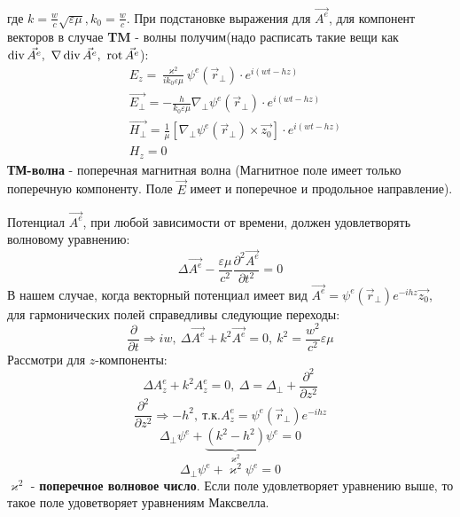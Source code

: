 где $k = \frac{w}{c}\sqrt{\varepsilon\mu}, k_0 = \frac{w}{c}$. При подстановке выражения для $\vec{A^e}$, для компонент
векторов в случае \textbf{TM} - волны получим(надо расписать такие вещи как $\operatorname{div}{\vec{A^e}},~ \nabla \operatorname{div}{\vec{A^e}},~\operatorname{rot}{\vec{A^e}}$):
\begin{align*}
  &E_z = \frac{\varkappa^2}{ik_0\varepsilon\mu} \psi^e(\vec{r}_{\perp})\cdot e^{i(wt-hz)}\\
  &\vec{E_{\perp}} = -\frac{h}{k_0\varepsilon\mu}\nabla_{\perp} \psi^e(\vec{r}_{\perp})\cdot e^{i(wt-hz)}\\
  &\vec{H_{\perp}} = \frac{1}{\mu}[\nabla_{\perp} \psi^e(\vec{r}_{\perp})\times\vec{z_0}]\cdot e^{i(wt-hz)}\\
  &H_z = 0
\end{align*}
\textbf{ТМ-волна} - поперечная магнитная волна (Магнитное поле имеет только поперечную компоненту. Поле $\vec{E}$ имеет и поперечное и
продольное направление). 

Потенциал $\vec{A^e}$, при любой зависимости от времени, должен удовлетворять волновому уравнению:
\begin{equation}
  \Delta \vec{A^e} - \frac{\varepsilon\mu}{c^2} \frac{\partial^2\vec{A^e}}{\partial t^2} = 0
\end{equation}
В нашем случае, когда векторный потенциал имеет вид $\vec{A^e} = \psi^e(\vec{r}_{\perp})e^{-ihz}\vec{z_0}$, для
гармонических полей справедливы следующие переходы:
\begin{equation}
  \frac{\partial}{\partial t} \Rightarrow iw,~ \Delta \vec{A^e} + k^2 \vec{A^e} =0,~ k^2 = \frac{w^2}{c^2}\varepsilon\mu
\end{equation}
Рассмотри для $z$-компоненты:
\begin{equation}
  \Delta A^e_z + k^2 A^e_z =0,~ \Delta = \Delta_{\perp} + \frac{\partial^2}{\partial z^2}
\end{equation}
\begin{equation}
  \frac{\partial^2}{\partial z^2} \Rightarrow -h^2,~ \text{т.к.} A^e_z = \psi^e(\vec{r}_{\perp})e^{-ihz}
\end{equation}
\begin{equation}
  \Delta_{\perp}\psi^e+\underbrace{(k^2-h^2)}_{\varkappa^2}\psi^e=0
\end{equation}
\begin{equation}
  \Delta_{\perp}\psi^e+\varkappa^2\psi^e=0
\end{equation}
$\varkappa^2$ - \textbf{поперечное волновое число}. Если поле удовлетворяет уравнению выше, то такое поле удоветворяет
уравнениям Максвелла.

